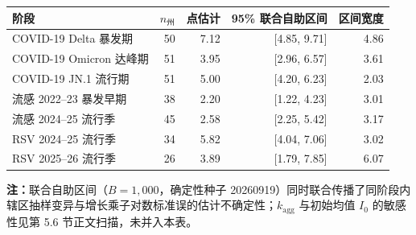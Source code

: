 \begin{tabular}{@{}lrrrr@{}}
\toprule
阶段 & $n_{\text{州}}$ & 点估计 & 95\% 联合自助区间 & 区间宽度 \\
\midrule
COVID-19 Delta 暴发期 & 50 & 7.12 & [4.85, 9.71] & 4.86 \\
COVID-19 Omicron 达峰期 & 51 & 3.95 & [2.96, 6.57] & 3.61 \\
COVID-19 JN.1 流行期 & 51 & 5.00 & [4.20, 6.23] & 2.03 \\
流感 2022--23 暴发早期 & 38 & 2.20 & [1.22, 4.23] & 3.01 \\
流感 2024--25 流行季 & 45 & 2.58 & [2.25, 5.42] & 3.17 \\
RSV 2024--25 流行季 & 34 & 5.82 & [4.04, 7.06] & 3.02 \\
RSV 2025--26 流行季 & 26 & 3.89 & [1.79, 7.85] & 6.07 \\
\bottomrule
\end{tabular}
\begin{flushleft}\scriptsize \textbf{注：}联合自助区间（$B=1{,}000$，确定性种子 20260919）同时联合传播了同阶段内辖区抽样变异与增长乘子对数标准误的估计不确定性；$k_{\text{agg}}$ 与初始均值 $I_0$ 的敏感性见第 5.6 节正文扫描，未并入本表。\end{flushleft}
